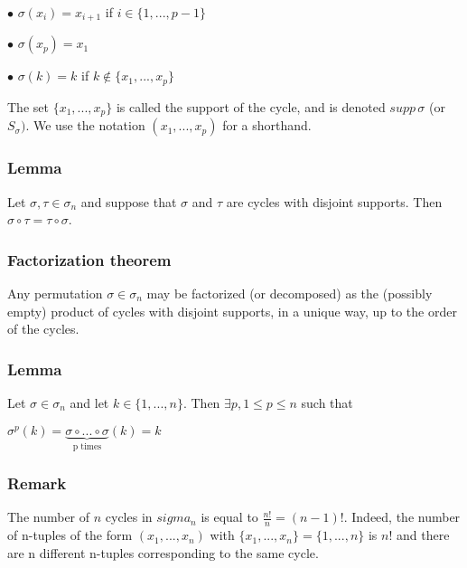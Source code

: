                 $\bullet$ $\sigma (x_i) = x_{i+1}$ if $i\in\{1,...,p-1\}$

                \vspace{2pt}

                $\bullet$ $\sigma (x_p) = x_1$

                \vspace{2pt}

                $\bullet$ $\sigma (k) = k$ if $k \notin\{x_1,...,x_p\}$
                \vspace{4pt}

                The set $\{x_1,...,x_p\}$ is called the support of the cycle, and is denoted $supp\,\sigma$ (or $S_\sigma)$. We use the notation $(x_1,...,x_p)$ for a shorthand.

            \subsubsection{Lemma}
                Let $\sigma, \tau\in \sigma_n$ and suppose that $\sigma$ and $\tau$ are cycles with disjoint supports. Then $\sigma\circ\tau=\tau\circ\sigma$.

            \newpage
            \subsubsection{Factorization theorem}
                Any permutation $\sigma\in\sigma_n$ may be factorized (or decomposed) as the (possibly empty) product of cycles with disjoint supports, in a unique way, up to the order of the cycles.

            \subsubsection{Lemma}
                Let $\sigma\in\sigma_n$ and let $k\in\{1,...,n\}$. Then $\exists p, 1\leq p\leq n$ such that

                \vspace{4pt}

                \centerline{$\sigma^p (k) = \underbrace{\sigma\circ...\circ\sigma}_{\text{p times}}(k)=k$}

            \subsubsection{Remark}
                The number of $n$ cycles in $sigma_n$ is equal to $\frac{n!}{n}=(n-1)!$. Indeed, the number of n-tuples of the form $(x_1,...,x_n)$ with $\{x_1,...,x_n\}=\{1,...,n\}$ is $n!$ and there are n different n-tuples corresponding to the same cycle.

